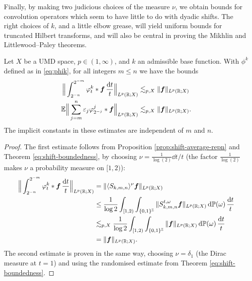 Finally, by making two judicious choices of the measure $\nu$, we obtain bounds for convolution operators which seem to have little to do with dyadic shifts.
The right choices of $k$, and a little elbow grease, will yield uniform bounds for truncated Hilbert transforms, and will also be central in proving the Mikhlin and Littlewood--Paley theorems. 

\begin{cor}\label{cor:intop-bounds}
  Let $X$ be a UMD space, $p \in (1,\infty)$, and $k$ an admissible base function.
  With $\phi^{k}$ defined as in \eqref{eq:phik}, for all integers $m \leq n$ we have the bounds
  \begin{equation*}
    \begin{aligned}
      \Big\| \int_{2^{-n}}^{2^{-m}} \varphi_{t}^{k} \ast \bm{f} \, \frac{\mathrm{d} t}{t} \Big\|_{L^p(\mathbb{R};X)} &\lesssim_{p,X} \|\bm{f}\|_{L^p(\mathbb{R};X)} \\
      \mathbb{E} \Big\| \sum_{j = m}^{n} \varepsilon_{j} \varphi_{2^{-j}}^{j} \ast \bm{f} \Big\|_{L^p(\mathbb{R};X)} &\lesssim_{p,X} \|\bm{f}\|_{L^p(\mathbb{R};X)}.
    \end{aligned}
  \end{equation*}
  The implicit constants in these estimates are independent of $m$ and $n$.
\end{cor}

\begin{proof}
  The first estimate follows from Proposition \ref{prop:shift-average-repn} and Theorem \ref{eq:shift-boundedness}, by choosing $\nu = \frac{1}{\log(2)}\dd t/t$ (the factor $\frac{1}{\log(2)}$ makes $\nu$ a probability measure on $[1,2)$):
  \begin{equation*}
    \begin{aligned}
      \Big\| \int_{2^{-n}}^{2^{-m}} \varphi_{t}^{k} \ast \bm{f} \, \frac{\mathrm{d} t}{t} \Big\|_{L^p(\mathbb{R};X)}
      &= \| \langle S_{k,m,n} \rangle^{\nu} \bm{f} \|_{L^p(\mathbb{R};X)} \\
      &\leq \frac{1}{\log 2}\int_{[1,2)} \int_{\{0,1\}^{\mathbb{Z}}} \|S_{k,m,n}^{t,\omega} \bm{f} \|_{L^p(\mathbb{R};X)} \, \mathrm{d}\mathbb{P}(\omega) \, \frac{\mathrm{d} t}{t} \\
      &\lesssim_{p,X} \frac{1}{\log 2} \int_{[1,2)} \int_{\{0,1\}^{\mathbb{Z}}} \| \bm{f} \|_{L^p(\mathbb{R};X)} \, \mathrm{d}\mathbb{P}(\omega) \, \frac{\mathrm{d} t}{t} \\
      &= \|\bm{f}\|_{L^p(\mathbb{R};X)}.
    \end{aligned}
  \end{equation*}
  The second estimate is proven in the same way, choosing $\nu = \delta_{1}$ (the Dirac measure at $t=1$) and using the randomised estimate from Theorem \ref{eq:shift-boundedness}.
\end{proof}

